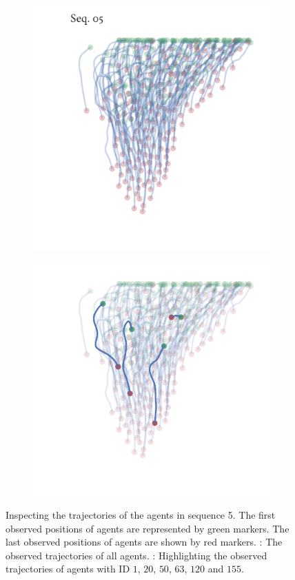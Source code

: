 \begin{figure}[!tbp]
	\begin{subfigure}[b]{0.5\textwidth}
		\centering
		\includegraphics{sequence05.pdf}
		\caption{}
		\label{subfig:seq05_traj_no_highlight}
	\end{subfigure}%
	\begin{subfigure}[b]{0.5\textwidth}
		\centering
		\includegraphics{sequence05_highlight.pdf}
		\caption{}
		\label{subfig:seq05_traj_highlight}
	\end{subfigure}
	\caption{Inspecting the trajectories of the agents in sequence 5. The first observed positions of 
agents are represented by green markers. The last observed positions of agents are shown by red 
markers. : The observed trajectories of all agents. 
: Highlighting the observed trajectories of agents with ID $1$, 
$20$, $50$, $63$, $120$ and $155$.}
	\label{fig:seq05_traj}
\end{figure}

